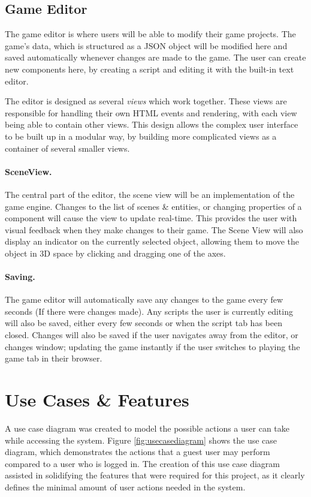 	\subsection{Game Editor}
	The game editor is where users will be able to modify their game projects. The game's data, which is structured as a JSON object will be modified here and saved automatically whenever changes are made to the game. The user can create new components here, by creating a script and editing it with the built-in text editor.

	The editor is designed as several \emph{views} which work together. These views are responsible for handling their own HTML events and rendering, with each view being able to contain other views. This design allows the complex user interface to be built up in a modular way, by building more complicated views as a container of several smaller views.

	\paragraph{SceneView.}
	The central part of the editor, the scene view will be an implementation of the game engine. Changes to the list of scenes \& entities, or changing properties of a component will cause the view to update real-time. This provides the user with visual feedback when they make changes to their game. The Scene View will also display an indicator on the currently selected object, allowing them to move the object in 3D space by clicking and dragging one of the axes.

	\paragraph{Saving.}
	The game editor will automatically save any changes to the game every few seconds (If there were changes made). Any scripts the user is currently editing will also be saved, either every few seconds or when the script tab has been closed. Changes will also be saved if the user navigates away from the editor, or changes window; updating the game instantly if the user switches to playing the game tab in their browser.

\section{Use Cases \& Features}
A use case diagram was created to model the possible actions a user can take while accessing the system. Figure \ref{fig:usecasediagram} shows the use case diagram, which demonstrates the actions that a guest user may perform compared to a user who is logged in. The creation of this use case diagram assisted in solidifying the features that were required for this project, as it clearly defines the minimal amount of user actions needed in the system.


